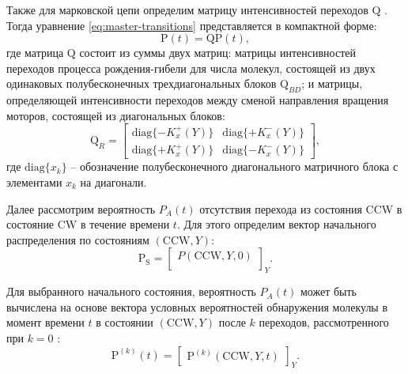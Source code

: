 Также для марковской цепи определим матрицу интенсивностей переходов $\boldsymbol{\mathrm{Q}}$ \cite{kapmen_stochastic_1990}. Тогда уравнение \cref{eq:master-transitions} представляется в компактной форме: 
\begin{equation}
    \boldsymbol{\mathrm{P}}(t) = \boldsymbol{\mathrm{Q}} \boldsymbol{\mathrm{P}}(t),
    \label{eq:master-transitions-compact}
\end{equation}
где матрица $\boldsymbol{\mathrm{Q}}$ состоит из суммы двух матриц: матрицы интенсивностей переходов процесса рождения-гибели для числа молекул, состоящей из двух одинаковых полубесконечных трехдиагональных блоков $\boldsymbol{\mathrm{Q}}_{BD}$; и матрицы, определяющей интенсивности переходов между сменой направления вращения моторов, состоящей из диагональных блоков:
\begin{equation}
    \boldsymbol{\mathrm{Q}}_{R} = 
    \begin{bmatrix} \mathrm{diag}\{-K^+_x (Y)\}&\mathrm{diag}\{+K^-_x (Y)\}\\ \mathrm{diag}\{+K^+_x (Y)\}&\mathrm{diag}\{-K^-_x (Y) \} \end{bmatrix},
    \label{eq:transition-block}
\end{equation}
где $\mathrm{diag}\{x_k\}$ -- обозначение полубесконечного диагонального матричного блока с элементами $x_k$ на диагонали.

Далее рассмотрим вероятность $P_A(t)$ отсутствия перехода из состояния CCW в состояние CW в течение времени $t$. Для этого определим вектор начального распределения по состояниям $(\mathrm{CCW}, Y)$:
\begin{equation}
    \boldsymbol{\mathrm{P_S}} = 
    \begin{bmatrix} P(\mathrm{CCW}, Y, 0)\\ \end{bmatrix}_Y.
    \label{eq:start-prob}
\end{equation}

Для выбранного начального состояния, вероятность $P_A(t)$ может быть вычислена на основе вектора условных вероятностей обнаружения молекулы в момент времени $t$ в состоянии $(\mathrm{CCW}, Y)$ после $k$ переходов, рассмотренного при $k=0$ \cite{mordovina_full-counting_2013}: 
\begin{equation}
    \boldsymbol{\mathrm{P}}^{(k)}(t) = \begin{bmatrix} \boldsymbol{\mathrm{P}}^{(k)}(\mathrm{CCW}, Y, t)\end{bmatrix}_Y.
    \label{eq:conditioned-transitions}
\end{equation}

